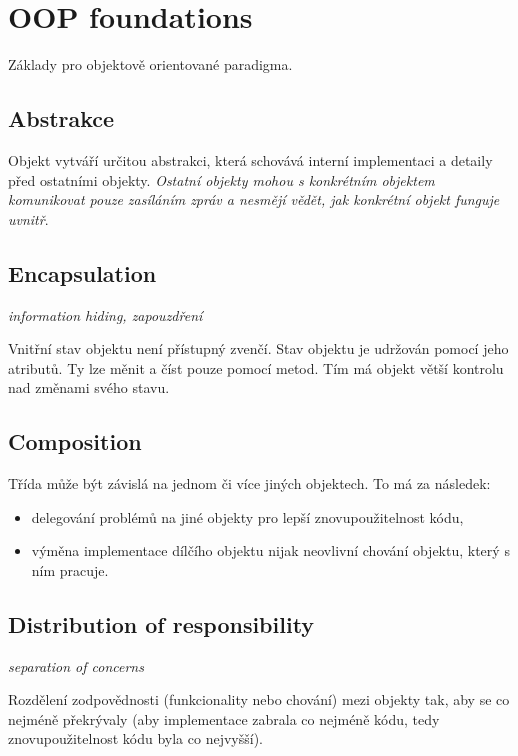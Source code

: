 \documentclass{szzclass}
\begin{document}
\section{OOP foundations}

Základy pro objektově orientované paradigma.

\subsection{Abstrakce}

Objekt vytváří určitou abstrakci, která schovává interní implementaci a detaily před ostatními objekty.
\textit{Ostatní objekty mohou s konkrétním objektem komunikovat pouze zasíláním zpráv a nesmějí vědět,
jak konkrétní objekt funguje uvnitř}.

\subsection{Encapsulation}

\textit{information hiding, zapouzdření}

Vnitřní stav objektu není přístupný zvenčí. Stav objektu je udržován pomocí jeho atributů.
Ty lze měnit a číst pouze pomocí metod. Tím má objekt větší kontrolu nad změnami svého stavu.

\subsection{Composition}

Třída může být závislá na jednom či více jiných objektech. To má za následek:
\begin{itemize}
      \item delegování problémů na jiné objekty pro lepší znovupoužitelnost kódu,
      \item výměna implementace dílčího objektu nijak neovlivní chování objektu, který s ním pracuje.
\end{itemize}

\subsection{Distribution of responsibility}

\textit{separation of concerns}

Rozdělení zodpovědnosti (funkcionality nebo chování) mezi objekty tak, aby se co nejméně překrývaly
(aby implementace zabrala co nejméně kódu, tedy znovupoužitelnost kódu byla co nejvyšší).
\end{document}
